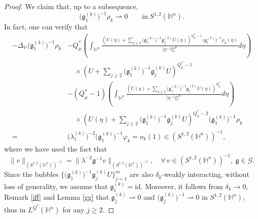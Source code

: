 \documentclass[11pt]{article}
\begin{document}
\begin{proof}
We claim that, up to a subsequence,
\begin{equation}\label{main50}
  \Big(\mathfrak{g}_1^{(k)}\Big)^{-1}\rho_k\rightharpoonup0 \qquad\mathrm{in}~S^{1,2}(\mathbb{H}^{n}).
\end{equation}
In fact, one can verify that
\begin{align*}
  -\Delta_{\mathbb{H} } \Big(\mathfrak{g}_1^{(k)}\Big)^{-1}\rho_k&-Q^{\ast}_{\mu}\left(\int_{\mathbb{H}^{n}}
  \frac{\left(U(\eta)+\sum\limits_{j\geq2}\Big(\mathfrak{g}_1^{(k)}\Big)^{-1} \mathfrak{g}_j^{(k)} U(\eta) \right)^{Q^{\ast}_{\mu}-1} \Big(\mathfrak{g}_1^{(k)}\Big)^{-1}\rho_k(\eta)}
{|\eta^{-1}\xi|^{\mu}}{d}\eta\right)\\
  &\quad \times\left(U+\sum\limits_{j\geq2}\Big(\mathfrak{g}_1^{(k)}\Big)^{-1} \mathfrak{g}_j^{(k)} U \right)^{Q^{\ast}_{\mu}-1}
\\
&-(Q^{\ast}_{\mu}-1)\left(\int_{\mathbb{H}^{n}}
  \frac{\left(U(\eta)+\sum\limits_{j\geq2}\Big(\mathfrak{g}_1^{(k)}\Big)^{-1} \mathfrak{g}_j^{(k)} U(\eta) \right)^{Q^{\ast}_{\mu}} %
  }
{|\eta^{-1}\xi|^{\mu}}{d}\eta\right)\\
&\quad \times \left(U(\eta)+\sum\limits_{j\geq2}\Big(\mathfrak{g}_1^{(k)}\Big)^{-1} \mathfrak{g}_j^{(k)} U \right)^{Q^{\ast}_{\mu}-2} \Big(\mathfrak{g}_1^{(k)}\Big)^{-1}\rho_k\\
=&\Big(\lambda_1^{(k)}\Big)^{-2}\Big(\mathfrak{g}_1^{(k)}\Big)^{-1}\varphi_k=o_k(1)\in (S^{1,2}(\mathbb{H}^{n}))^{-1},
\end{align*}
where we have used the fact that
\begin{equation*}
  \|v\|_{(S^{1,2}(\mathbb{H}^{n}))^{-1}}=\|\lambda^{-2}\mathfrak{g}^{-1}v\|_{(S^{1,2}(\mathbb{H}^{n}))^{-1}},\quad \forall \, v\in (S^{1,2}(\mathbb{H}^{n}))^{-1},\ \mathfrak{g}\in \mathcal{G}.
\end{equation*}
Since the bubbles $\big\{\big(\mathfrak{g}_1^{(k)}\big)^{-1} \mathfrak{g}_j^{(k)} U \big\}_{j=1}^{m}$ are also $\delta_k$-weakly interacting,
 without loss of generality, we assume that $\mathfrak{g}_1^{(k)}= \mathrm{id}$.
 Moreover, it follows from $\delta_k\rightarrow0$,  Remark \ref{iff} and Lemma \ref{gg} that $\mathfrak{g}_j^{(k)}\rightharpoonup0$ and $\big(\mathfrak{g}_j^{(k)}\big)^{-1}\rightharpoonup0$ in $S^{1,2}(\mathbb{H}^{n})$, thus in $L^{Q^*}(\mathbb{H}^{n})$ for any $j \geq 2$.

\end{proof}
\end{document}
